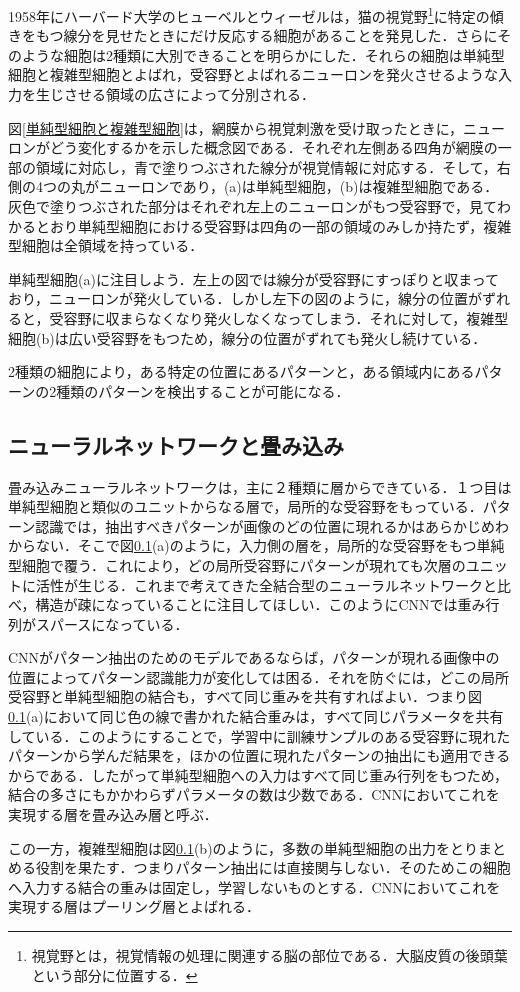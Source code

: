 \documentclass[a4paper,11pt]{jsreport}
\begin{document}
1958年にハーバード大学のヒューベルとウィーゼルは，猫の視覚野\footnote{視覚野とは，視覚情報の処理に関連する脳の部位である．大脳皮質の後頭葉という部分に位置する．}に特定の傾きをもつ線分を見せたときにだけ反応する細胞があることを発見した．さらにそのような細胞は2種類に大別できることを明らかにした．それらの細胞は単純型細胞と複雑型細胞とよばれ，受容野とよばれるニューロンを発火させるような入力を生じさせる領域の広さによって分別される．\par
図\ref{単純型細胞と複雑型細胞}は，網膜から視覚刺激を受け取ったときに，ニューロンがどう変化するかを示した概念図である．それぞれ左側ある四角が網膜の一部の領域に対応し，青で塗りつぶされた線分が視覚情報に対応する．そして，右側の4つの丸がニューロンであり，(a)は単純型細胞，(b)は複雑型細胞である．灰色で塗りつぶされた部分はそれぞれ左上のニューロンがもつ受容野で，見てわかるとおり単純型細胞における受容野は四角の一部の領域のみしか持たず，複雑型細胞は全領域を持っている．\par
単純型細胞(a)に注目しよう．左上の図では線分が受容野にすっぽりと収まっており，ニューロンが発火している．しかし左下の図のように，線分の位置がずれると，受容野に収まらなくなり発火しなくなってしまう．それに対して，複雑型細胞(b)は広い受容野をもつため，線分の位置がずれても発火し続けている．\par
2種類の細胞により，ある特定の位置にあるパターンと，ある領域内にあるパターンの2種類のパターンを検出することが可能になる．

\subsection{ニューラルネットワークと畳み込み}
畳み込みニューラルネットワークは，主に２種類に層からできている．１つ目は単純型細胞と類似のユニットからなる層で，局所的な受容野をもっている．パターン認識では，抽出すべきパターンが画像のどの位置に現れるかはあらかじめわからない．そこで図\ref{}(a)のように，入力側の層を，局所的な受容野をもつ単純型細胞で覆う．これにより，どの局所受容野にパターンが現れても次層のユニットに活性が生じる．これまで考えてきた全結合型のニューラルネットワークと比べ，構造が疎になっていることに注目してほしい．このようにCNNでは重み行列がスパースになっている．\par
CNNがパターン抽出のためのモデルであるならば，パターンが現れる画像中の位置によってパターン認識能力が変化しては困る．それを防ぐには，どこの局所受容野と単純型細胞の結合も，すべて同じ重みを共有すればよい．つまり図\ref{}(a)において同じ色の線で書かれた結合重みは，すべて同じパラメータを共有している．このようにすることで，学習中に訓練サンプルのある受容野に現れたパターンから学んだ結果を，ほかの位置に現れたパターンの抽出にも適用できるからである．したがって単純型細胞への入力はすべて同じ重み行列をもつため，結合の多さにもかかわらずパラメータの数は少数である．CNNにおいてこれを実現する層を畳み込み層と呼ぶ．\par
この一方，複雑型細胞は図\ref{}(b)のように，多数の単純型細胞の出力をとりまとめる役割を果たす．つまりパターン抽出には直接関与しない．そのためこの細胞へ入力する結合の重みは固定し，学習しないものとする．CNNにおいてこれを実現する層はプーリング層とよばれる．
\end{document}
